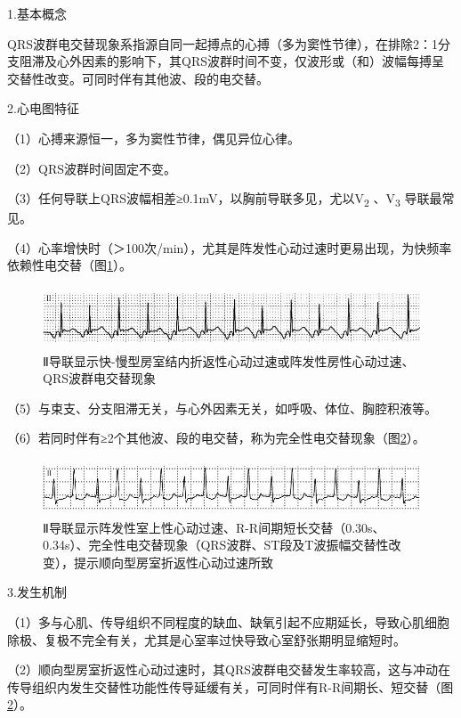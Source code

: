 1.基本概念

QRS波群电交替现象系指源自同一起搏点的心搏（多为窦性节律），在排除2：1分支阻滞及心外因素的影响下，其QRS波群时间不变，仅波形或（和）波幅每搏呈交替性改变。可同时伴有其他波、段的电交替。

2.心电图特征

（1）心搏来源恒一，多为窦性节律，偶见异位心律。

（2）QRS波群时间固定不变。

（3）任何导联上QRS波幅相差≥0.1mV，以胸前导联多见，尤以V\textsubscript{2}
、V\textsubscript{3} 导联最常见。

（4）心率增快时（＞100次/min），尤其是阵发性心动过速时更易出现，为快频率依赖性电交替（图\ref{fig39-3}）。

\begin{figure}[!htbp]
 \centering
 \includegraphics[width=5.58333in,height=0.71875in]{./images/Image00652.jpg}
 \captionsetup{justification=centering}
 \caption{Ⅱ导联显示快-慢型房室结内折返性心动过速或阵发性房性心动过速、QRS波群电交替现象}
 \label{fig39-3}
  \end{figure} 

（5）与束支、分支阻滞无关，与心外因素无关，如呼吸、体位、胸腔积液等。

（6）若同时伴有≥2个其他波、段的电交替，称为完全性电交替现象（图\ref{fig39-4}）。

\begin{figure}[!htbp]
 \centering
 \includegraphics[width=5.61458in,height=0.64583in]{./images/Image00653.jpg}
 \captionsetup{justification=centering}
 \caption{Ⅱ导联显示阵发性室上性心动过速、R-R间期短长交替（0.30s、0.34s）、完全性电交替现象（QRS波群、ST段及T波振幅交替性改变），提示顺向型房室折返性心动过速所致}
 \label{fig39-4}
  \end{figure} 

3.发生机制

（1）多与心肌、传导组织不同程度的缺血、缺氧引起不应期延长，导致心肌细胞除极、复极不完全有关，尤其是心室率过快导致心室舒张期明显缩短时。

（2）顺向型房室折返性心动过速时，其QRS波群电交替发生率较高，这与冲动在传导组织内发生交替性功能性传导延缓有关，可同时伴有R-R间期长、短交替（图\ref{fig39-4}）。

